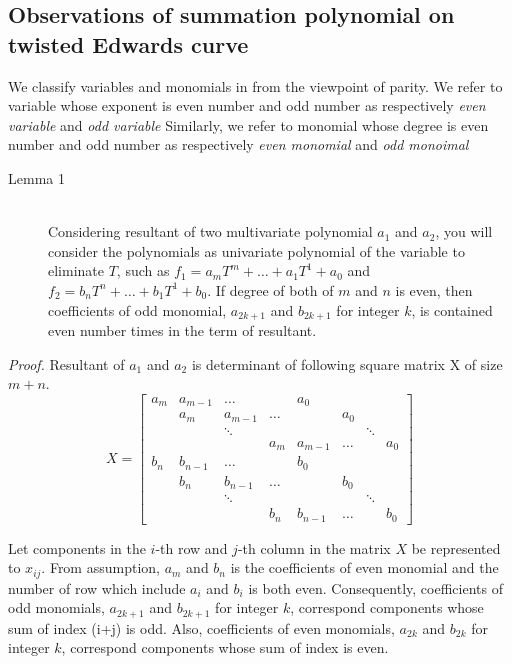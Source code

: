 \subsection{Observations of summation polynomial on twisted Edwards curve}

We classify variables and monomials in from the viewpoint of parity. 
%
We refer to variable whose exponent is even number and odd number 
as respectively \emph{even variable} and \emph{odd variable}
%
Similarly, we refer to monomial whose degree is even number and odd number 
as respectively \emph{even monomial} and \emph{odd monoimal}


\begin{description}
  \item [Lemma 1]~\\
  Considering resultant of two multivariate polynomial $a_1$ and $a_2$,
  you will consider the polynomials as univariate polynomial of the variable
  to eliminate $T$, such as $f_1 = a_mT^m + \dots +a_1T^1 + a_0$ 
  and $f_2 = b_nT^n + \dots +b_1T^1 + b_0$.
  If degree of both of $m$ and $n$ is even, 
  then coefficients of odd monomial, $a_{2k+1}$ and $b_{2k+1}$ for integer $k$,
  is contained even number times in the term of resultant.
\end{description}

\noindent
\emph{Proof.}
%
Resultant of $a_1$ and $a_2$ is 
determinant of following square matrix X of size $m+n$.
%
\begin{equation*}
X =
\begin{bmatrix}
  a_m & a_{m-1} & \ldots & & a_0 & & &  \\
          & a_m & a_{m-1} & \ldots & & a_0  & &  \\
  & & \ddots & & & & \ddots &  \\
    & & & a_m & a_{m-1} & \ldots & & a_0  \\
  b_n & b_{n-1} & \ldots & & b_0 & & &  \\
       & b_n & b_{n-1} & \ldots & & b_0  & &  \\
  & & \ddots & & & & \ddots &  \\
    & & & b_n & b_{n-1} & \ldots & & b_0
\end{bmatrix}
\end{equation*}

Let components in the $i$-th row and $j$-th column in the matrix $X$ 
be represented to $x_{ij}$. 
%
From assumption, $a_m$ and $b_n$ is the coefficients of even monomial
and the number of row which include $a_i$ and $b_i$ is both even.
%
Consequently, coefficients of odd monomials, $a_{2k+1}$ and $b_{2k+1}$ 
for integer $k$, correspond components whose sum of index (i+j) is odd.
%
Also, coefficients of even monomials, $a_{2k}$ and $b_{2k}$ for 
integer $k$, correspond components whose sum of index is even.

